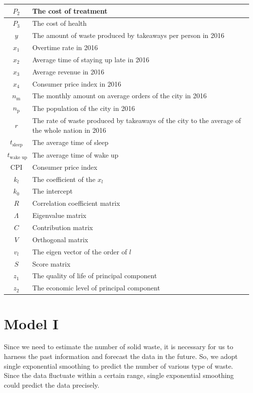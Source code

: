 \documentclass[UTF8]{article}
\begin{document}
\begin{table}[hpt]
\begin{center}
\begin{tabular}{cl}
\hline
\(P_2\)&The cost of treatment\\
\hline
\(P_3\)&The cost of health\\
\hline
\(y\)&The amount of waste produced by takeaways per person in 2016\\
\hline
\(x_1\)&Overtime rate in 2016\\
\hline
\(x_2\)&Average time of staying up late in 2016\\
\hline
\(x_3\)&Average revenue in 2016\\
\hline
\(x_4\)&Consumer price index in 2016\\
\hline
\(n_{\textrm{m}}\)&The monthly amount on average orders of the city in 2016\\
\hline
\(n_{\textrm{p}}\)&The population of the city in 2016\\
\hline
\(r\)&The rate of waste produced by takeaways of the city to the average of the whole nation in 2016\\
\hline
\(t_{\textrm{sleep}}\)&The average time of sleep\\
\hline
\(t_{\textrm{wake\ up}}\)&The average time of wake up\\
\hline
CPI&Consumer price index\\
\hline
\(k_l\)&The coefficient of the \(x_l\)\\
\hline
\(k_0\)&The intercept\\
\hline
\(R\)&Correlation coefficient matrix\\
\hline
\(\Lambda\)&Eigenvalue matrix\\
\hline
\(C\)&Contribution matrix\\
\hline
\(V\)&Orthogonal matrix\\
\hline
\(v_l\)&The eigen vector of the order of \(l\)\\
\hline
\(S\)&Score matrix\\
\hline
\(z_1\)&The quality of life of principal component\\
\hline
\(z_2\)&The economic level of principal component\\
\hline
\end{tabular}
\end{center}
\end{table}
\newpage

\section{Model I}
Since we need to estimate the number of solid waste, it is necessary for us to harness the past information and forecast the data in the future. So, we adopt single exponential smoothing to predict the number of various type of waste. Since the data fluctuate within a certain range, single exponential smoothing could predict the data precisely.
\end{document}
